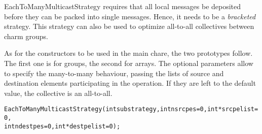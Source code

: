 {%


EachToManyMulticastStrategy requires that all local messages be deposited
before they can be packed into single messages. Hence, it needs to be a {\em
bracketed} strategy. This strategy can also be used to optimize all-to-all collectives between charm
groups.




As for the constructors to be used in the main chare, the two prototypes follow.
The first one is for groups, the second for arrays. The optional parameters
allow to specify the many-to-many behaviour, passing the lists of source and
destination elements participating in the operation. If they are left to the
default value, the collective is an all-to-all.

\begin{alltt}
EachToManyMulticastStrategy(int substrategy, int nsrcpes=0, int *srcpelist=0,
                            int ndestpes=0, int *destpelist=0);


\end{alltt}}
